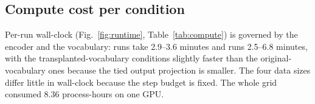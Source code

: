 \subsection{Compute cost per condition}
\label{sec:res:cost}
Per-run wall-clock (Fig.~\ref{fig:runtime}, Table~\ref{tab:compute}) is governed by the encoder and the vocabulary: \xlmxv{} runs take 2.9–3.6 minutes and \xlmr{} runs 2.5–6.8 minutes, with the transplanted-vocabulary conditions slightly faster than the original-vocabulary ones because the tied output projection is smaller. The four data sizes differ little in wall-clock because the step budget is fixed. The whole grid consumed 8.36 process-hours on one GPU.
